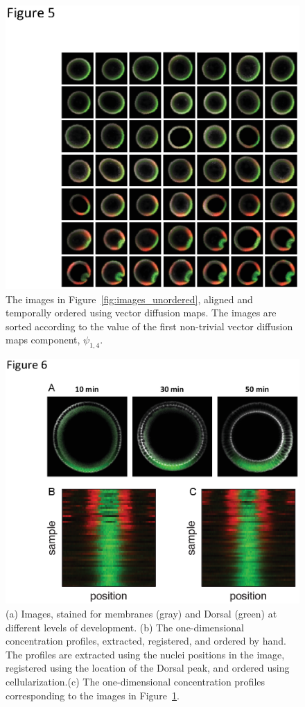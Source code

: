 \documentclass{pnastwo}
\begin{document}
\begin{figure}
\includegraphics{figures_0329_mac_5}
\caption{The images in Figure~\ref{fig:images_unordered}, aligned and temporally ordered using vector diffusion maps. The images are sorted according to the value of the first non-trivial vector diffusion maps component, $\psi_{1, 4}$.}
\label{fig:images_ordered}
\end{figure}

\begin{figure}
\includegraphics{figures_0329_mac_6}
\caption{(a) Images, stained for membranes (gray) and Dorsal (green) at different levels of development. (b) The one-dimensional concentration profiles, extracted, registered, and ordered by hand. The profiles are extracted using the nuclei positions in the image, registered using the location of the Dorsal peak, and ordered using cellularization.(c) The one-dimensional concentration profiles corresponding to the images in Figure~\ref{fig:images_ordered}. }
\label{fig:membrane_compare}
\end{figure}
\end{document}
